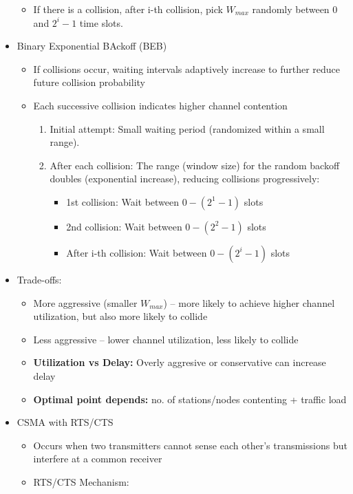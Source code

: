 \documentclass[10pt,landscape]{article}
\newcommand{\1}{\mathmybb{1}}
\begin{document}
\begin{multicols*}{3}
\begin{itemize}
\begin{itemize}
    \item If there is a collision, after i-th collision, pick $W_{max}$ randomly between $0$ and $2^i -1$ time slots.
  \end{itemize}
  \item Binary Exponential BAckoff (BEB)
  \begin{itemize}
    \item If collisions occur, waiting intervals adaptively increase to further reduce future collision probability
    \item Each successive collision indicates higher channel contention
    \begin{enumerate}
      \item Initial attempt: Small waiting period (randomized within a small range).
      \item After each collision: The range (window size) for the random backoff doubles (exponential increase), reducing collisions progressively:
      \begin{itemize}
        \item 1st collision: Wait between $0 - (2^1-1)$ slots
        \item 2nd collision: Wait between $0 - (2^2-1)$ slots
        \item After i-th collision: Wait between $0 - (2^i-1)$ slots
      \end{itemize}
    \end{enumerate}
  \end{itemize}
  \item Trade-offs:
  \begin{itemize}
    \item More aggressive (smaller $W_{max}$) – more likely to achieve higher channel utilization,
    but also more likely to collide
    \item Less aggressive – lower channel utilization, less likely to collide
    \item \textbf{Utilization vs Delay:} Overly aggresive or conservative can increase delay
    \item \textbf{Optimal point depends:} no. of stations/nodes contenting + traffic load
  \end{itemize}
  \item CSMA with RTS/CTS
  \begin{itemize}
    \item Occurs when two transmitters cannot sense each other’s transmissions
    but interfere at a common receiver
    \item RTS/CTS Mechanism:

\end{itemize}
\end{itemize}
\end{multicols*}
\end{document}
